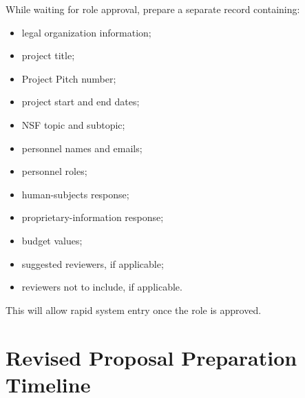 \documentclass[11pt,letterpaper]{article}
\begin{document}
While waiting for role approval, prepare a separate record containing:

\begin{itemize}[leftmargin=0.25in]
    \item legal organization information;
    \item project title;
    \item Project Pitch number;
    \item project start and end dates;
    \item NSF topic and subtopic;
    \item personnel names and emails;
    \item personnel roles;
    \item human-subjects response;
    \item proprietary-information response;
    \item budget values;
    \item suggested reviewers, if applicable;
    \item reviewers not to include, if applicable.
\end{itemize}

This will allow rapid system entry once the role is approved.

\section{Revised Proposal Preparation Timeline}
\end{document}
